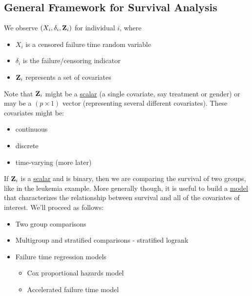 \documentclass[11pt,slidesonly,semrot,portrait,palatino]{book}
\begin{document}
\subsection{General Framework for Survival Analysis}
We observe $(X_i, \delta_i, {\bf Z}_i)$ for individual $i$, where
\begin{itemize}
\item $X_i$ is a censored failure time random variable
\item $\delta_i$ is the failure/censoring indicator
\item ${\bf Z}_i$ represents a set of covariates
\end{itemize}
Note that ${\bf Z}_i$ might be a \underline{scalar} (a single covariate, say
treatment or gender) or may be a $(p\times 1)$ vector (representing
several different covariates).
These covariates might be:
\begin{itemize}
\item  continuous
\item  discrete
\item  time-varying (more later)
\end{itemize}
If ${\bf Z}_i$ is a \underline{scalar} and is binary, then we are
comparing the survival of two groups, like in the leukemia example.
More generally though, it is useful to build a \underline{model} that
characterizes the relationship between survival and all of the covariates
of interest.
We'll proceed as follows:
\begin{itemize}
\item  Two group comparisons
\item  Multigroup and stratified comparisons - stratified logrank
\item  Failure time regression models
\begin{itemize}
\item Cox proportional hazards model
\item Accelerated failure time model
\end{itemize}
\end{itemize}
\end{document}

